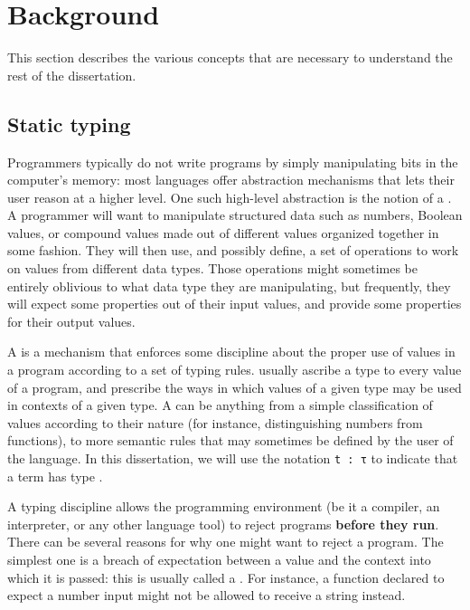 \chapter{Background}

This section describes the various concepts that are necessary to understand the
rest of the dissertation.

\section{Static typing}
\label{static-typing}



Programmers typically do not write programs by simply manipulating bits in the
computer's memory: most languages offer abstraction mechanisms that lets their
user reason at a higher level.  One such high-level abstraction is the notion of
a .  A programmer will want to manipulate structured data such
as numbers, Boolean values, or compound values made out of different values
organized together in some fashion.  They will then use, and possibly define, a
set of operations to work on values from different data types.  Those operations
might sometimes be entirely oblivious to what data type they are manipulating,
but frequently, they will expect some properties out of their input values, and
provide some properties for their output values.

A  is a mechanism that enforces some discipline about the
proper use of values in a program according to a set of typing rules.
 usually ascribe a type to every value of a program, and
prescribe the ways in which values of a given type may be used in contexts of a
given type.  A  can be anything from a simple classification of
values according to their nature (for instance, distinguishing numbers from
functions), to more semantic rules that may sometimes be defined by the user of
the language.  In this dissertation, we will use the notation \texttt{t
: τ} to indicate that a term  has type .

A  typing discipline allows the programming environment (be it a
compiler, an interpreter, or any other language tool) to reject programs
\textbf{before they run}.  There can be several reasons for why one might want
to reject a program.  The simplest one is a breach of expectation between a
value and the context into which it is passed: this is usually called a
.  For instance, a function declared to expect a number input
might not be allowed to receive a string instead.

